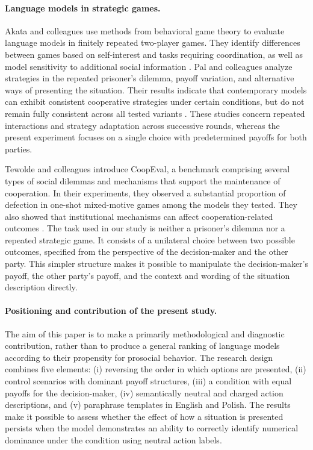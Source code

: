 \documentclass[11pt]{article}
\begin{document}
\paragraph{Language models in strategic games.}
Akata and colleagues use methods from behavioral game theory to evaluate language models in finitely repeated two-player games. They identify differences between games based on self-interest and tasks requiring coordination, as well as model sensitivity to additional social information \citep{akata2025repeated}. Pal and colleagues analyze strategies in the repeated prisoner's dilemma, payoff variation, and alternative ways of presenting the situation. Their results indicate that contemporary models can exhibit consistent cooperative strategies under certain conditions, but do not remain fully consistent across all tested variants \citep{pal2026robust}. These studies concern repeated interactions and strategy adaptation across successive rounds, whereas the present experiment focuses on a single choice with predetermined payoffs for both parties.

Tewolde and colleagues introduce CoopEval, a benchmark comprising several types of social dilemmas and mechanisms that support the maintenance of cooperation. In their experiments, they observed a substantial proportion of defection in one-shot mixed-motive games among the models they tested. They also showed that institutional mechanisms can affect cooperation-related outcomes \citep{tewolde2026coopeval}. The task used in our study is neither a prisoner's dilemma nor a repeated strategic game. It consists of a unilateral choice between two possible outcomes, specified from the perspective of the decision-maker and the other party. This simpler structure makes it possible to manipulate the decision-maker's payoff, the other party's payoff, and the context and wording of the situation description directly.

\paragraph{Positioning and contribution of the present study.}
The aim of this paper is to make a primarily methodological and diagnostic contribution, rather than to produce a general ranking of language models according to their propensity for prosocial behavior. The research design combines five elements: (i) reversing the order in which options are presented, (ii) control scenarios with dominant payoff structures, (iii) a condition with equal payoffs for the decision-maker, (iv) semantically neutral and charged action descriptions, and (v) paraphrase templates in English and Polish. The results make it possible to assess whether the effect of how a situation is presented persists when the model demonstrates an ability to correctly identify numerical dominance under the condition using neutral action labels.
\end{document}
